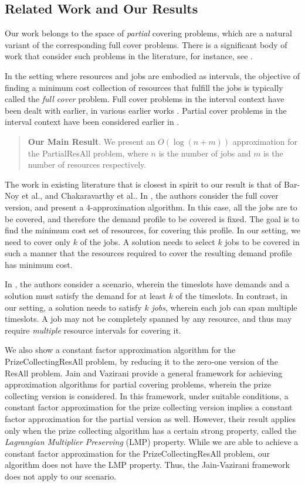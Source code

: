 \documentclass[11pt]{article}
\newcommand{\ResAll} {{\sc ResAll}}
\newcommand{\PResAll}{{\sc PartialResAll}}
\newcommand{\PCResAll}{{\sc PrizeCollectingResAll}}
\begin{document}
\subsection{Related Work and Our Results}
Our work belongs to the space of {\em partial} covering problems, which are a 
natural variant of the corresponding full cover problems. There is a significant body of work 
that consider such problems in the literature, for instance, see \cite{Garg05,Bar01,JV01,KPS11,GKS04}.

In the setting where resources and jobs are embodied as intervals, the objective of finding a minimum cost collection of
resources that fulfill the jobs is typically called the {\em full cover} problem. Full cover problems in the interval context have 
been dealt with earlier, in various earlier works \cite{Bar-Noy,bhatia07,cgk10}. Partial cover 
problems in the interval context have been considered earlier in \cite{esa2011}.
\begin{quote}
{\bf Our Main Result}.
We present an $O(\log (n+m))$ approximation for the {\PResAll} problem, where
$n$ is the number of jobs and $m$ is the number of resources respectively.
\end{quote}
The work in existing literature that is closest in spirit to our result is that of
Bar-Noy et al.\cite{Bar-Noy}, and Chakaravarthy et al.\cite{esa2011}.
In \cite{Bar-Noy}, the authors consider the full cover version, and present 
a $4$-approximation algorithm. In this case, all the jobs are to be covered, 
and therefore the demand profile to be covered is fixed. The goal is to find the 
minimum cost set of resources, for covering this profile. 
In our setting, 
we need to cover only $k$ of the jobs. 
A solution needs to select $k$ jobs to be covered in such a manner 
that  the resources required to cover the resulting demand profile has minimum cost.  

In \cite{esa2011}, the authors consider a scenario, wherein the 
timeslots have demands and a solution must satisfy the demand for at least $k$ of the timeslots. 
In contrast, in our setting, a solution needs to satisfy $k$ {\em jobs}, wherein 
each job can span multiple timeslots. 
A job may not be completely spanned by any resource, and thus may require
{\em multiple} resource intervals for covering it.  

We also show a constant factor approximation algorithm for the {\PCResAll} problem, by reducing it 
to the zero-one version of the {\ResAll} problem. 
Jain and Vazirani \cite{JV01} provide a general framework for achieving approximation algorithms for partial 
covering problems, wherein the prize collecting version is considered. In this framework, under suitable conditions, 
a constant factor approximation for the prize collecting version implies a constant factor approximation
for the partial version as well. However, their result applies only when the prize collecting algorithm has a
 certain strong property, called the {\em Lagrangian Multiplier Preserving} (LMP) property. 
While we are able to achieve a constant factor approximation for the {\PCResAll} problem, 
our algorithm does not have the LMP property. Thus, the Jain-Vazirani framework does not apply 
to our scenario. 
\end{document}
